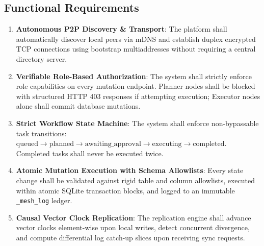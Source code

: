 \documentclass[12pt,a4paper]{report}
\begin{document}
\subsection{Functional Requirements}
\begin{enumerate}[label=\roman*.,leftmargin=*,itemsep=3pt]
    \item \textbf{Autonomous P2P Discovery \& Transport}: The platform shall automatically discover local peers via mDNS and establish duplex encrypted TCP connections using bootstrap multiaddresses without requiring a central directory server.
    \item \textbf{Verifiable Role-Based Authorization}: The system shall strictly enforce role capabilities on every mutation endpoint. Planner nodes shall be blocked with structured HTTP 403 responses if attempting execution; Executor nodes alone shall commit database mutations.
    \item \textbf{Strict Workflow State Machine}: The system shall enforce non-bypassable task transitions: $\text{queued} \rightarrow \text{planned} \rightarrow \text{awaiting\_approval} \rightarrow \text{executing} \rightarrow \text{completed}$. Completed tasks shall never be executed twice.
    \item \textbf{Atomic Mutation Execution with Schema Allowlists}: Every state change shall be validated against rigid table and column allowlists, executed within atomic SQLite transaction blocks, and logged to an immutable \texttt{\_mesh\_log} ledger.
    \item \textbf{Causal Vector Clock Replication}: The replication engine shall advance vector clocks element-wise upon local writes, detect concurrent divergence, and compute differential log catch-up slices upon receiving sync requests.
\end{enumerate}
\end{document}
